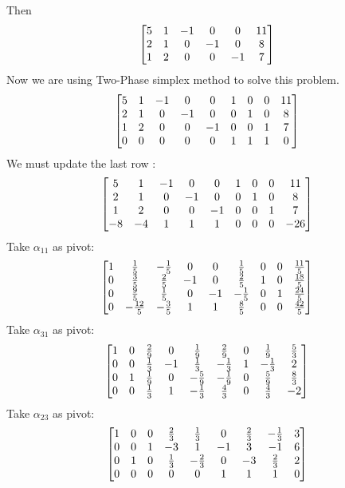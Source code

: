 \documentclass{article}
\begin{document}
Then \\
\begin{align*} 
\begin{bmatrix} 5 & 1 & -1 & 0 & 0  & 11 \\ 2 & 1 & 0 & -1 & 0 & 8 \\ 1 & 2 &  0 & 0 & -1 & 7  \end{bmatrix} 
\end{align*} 
Now we are using Two-Phase simplex method to solve this problem. \\
\begin{align*}
\begin{bmatrix} 5 & 1 & -1 & 0 & 0 & 1 & 0 & 0 & 11 \\ 2 & 1 & 0 & -1 & 0 & 0 & 1 & 0 & 8 \\ 1 & 2 & 0 & 0 & -1 & 0 & 0 & 1 & 7\\ 0 & 0 & 0 & 0 & 0 & 1 & 1 & 1 & 0  \end{bmatrix}
 \end{align*}
We must update the last row : \\
\begin{align*}
\begin{bmatrix} 5 & 1 & -1 & 0 & 0 & 1 & 0 & 0 & 11 \\ 2 & 1 & 0 & -1 & 0 & 0 & 1 & 0 & 8 \\ 1 & 2 & 0 & 0 & -1 & 0 & 0 & 1 & 7\\ -8 & -4 & 1 & 1 & 1 & 0 & 0 & 0 & -26  \end{bmatrix}
\end{align*}
Take $\alpha_{11} $ as pivot: 
\begin{align*}
\begin{bmatrix} 1 & \frac{1}{5} & -\frac{1}{5} & 0 & 0 &  \frac{1}{5} & 0 & 0 & \frac{11}{5} \\
0 & \frac{3}{5} & \frac{2}{5} & -1 & 0 & \frac{2}{5} & 1 & 0 & \frac{18}{5} \\
0 & \frac{9}{5} & \frac{1}{5} & 0 & -1 & -\frac{1}{5} & 0 & 1 & \frac{24}{5} \\
0 & -\frac{12}{5} & -\frac{3}{5} &  1 & 1 & \frac{8}{5} & 0 & 0 & \frac{42}{5} \\ \end{bmatrix} 
\end{align*}
Take $\alpha_{31} $ as pivot: 
\begin{align*} 
\begin{bmatrix} 1 & 0 & \frac{2}{9} & 0 & \frac{1}{9} & \frac{2}{9} & 0 & \frac{1}{9} & \frac{5}{3} \\
0 & 0 & \frac{1}{3} & -1 & \frac{1}{3} & -\frac{1}{3} &  1 & -\frac{1}{3} & 2 \\
0 & 1 & \frac{1}{9} & 0 & -\frac{5}{9} & -\frac{1}{9} & 0 & \frac{5}{9} & \frac{8}{3} \\
0 & 0 & \frac{1}{3} & 1 & -\frac{1}{3} & \frac{4}{3} & 0 & \frac{4}{3} & -2 \end{bmatrix} 
\end{align*}
Take $\alpha_{23}$ as pivot: 
\begin{align*} 
\begin{bmatrix} 1 & 0 & 0 & \frac{2}{3} & \frac{1}{3} & 0 & \frac{2}{3} & -\frac{1}{3} & 3 \\
0 & 0 & 1 & -3 & 1 & -1 & 3 & -1 & 6 \\
0 & 1 & 0 & \frac{1}{3} & -\frac{2}{3} & 0 & -3 & \frac{2}{3} & 2 \\
0 & 0 & 0 & 0 & 0 & 1 & 1 & 1 & 0 \end{bmatrix} 
\end{align*} 
\end{document}
